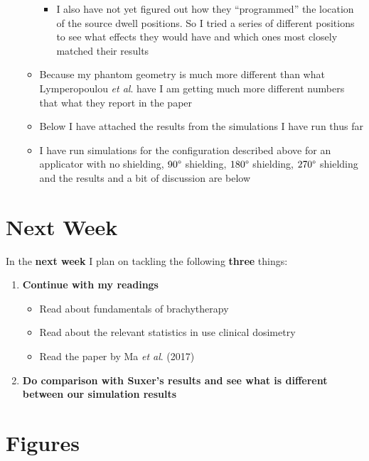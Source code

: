 \documentclass[12pt]{article}
\begin{document}
\begin{enumerate}
\begin{itemize}
\begin{itemize}
			\item I also have not yet figured out how they ``programmed'' the location of the source dwell positions. So I tried a series of different positions to see what effects they would have and which ones most closely matched their results
		\end{itemize}
		\item Because my phantom geometry is much more different than what Lymperopoulou \textit{et al}. have I am getting much more different numbers that what they report in the paper
		\item Below I have attached the results from the simulations I have run thus far
		\item I have run simulations for the configuration described above for an applicator with no shielding, $ 90\degree $ shielding, $ 180\degree $ shielding, $ 270\degree $ shielding and the results and a bit of discussion are below
	\end{itemize}
\end{enumerate}

\section{Next Week}

In the \textbf{next week} I plan on tackling the following \textbf{three} things:

\begin{enumerate}
	\item \textbf{Continue with my readings}
	\begin{itemize}
		\item Read about fundamentals of brachytherapy
		\item Read about the relevant statistics in use clinical dosimetry
		\item Read the paper by Ma \textit{et al}. (2017)
	\end{itemize}
	\item \textbf{Do comparison with Suxer's results and see what is different between our simulation results}
\end{enumerate}	

\section{Figures}
\end{document}
